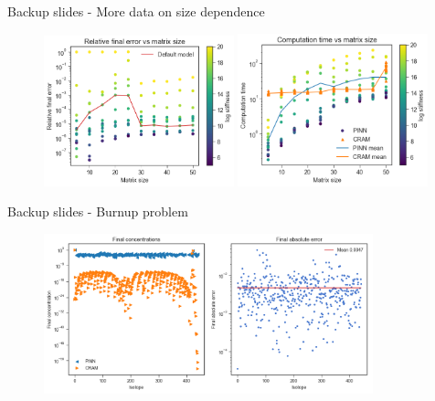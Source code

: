 \documentclass[9pt]{beamer}
\begin{document}
\begin{frame}[fragile]{Backup slides - More data on size dependence}
\begin{figure}
    \centering
    \includegraphics[width=0.49\textwidth]{error_vs_size_multi.png}
    \includegraphics[width=0.49\textwidth]{time_vs_size_multi.png}
    \label{fig:my_label}
\end{figure}
\end{frame}


\begin{frame}[fragile]{Backup slides - Burnup problem}
\begin{figure}
    \centering
    \includegraphics[width=0.85\textwidth]{burnup_over_time.png}
    \label{fig:my_label}
\end{figure}
\end{frame}
\end{document}
